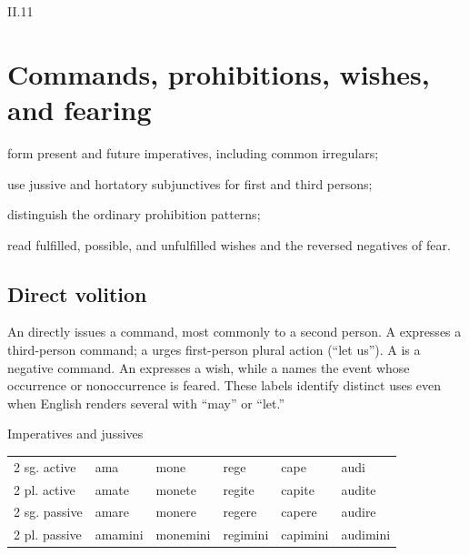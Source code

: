 \begin{courseunit}{II.11}
\chapter{Commands, prohibitions, wishes, and fearing}

\begin{learningobjectives}
  \item form present and future imperatives, including common irregulars;
  \item use jussive and hortatory subjunctives for first and third persons;
  \item distinguish the ordinary prohibition patterns;
  \item read fulfilled, possible, and unfulfilled wishes and the reversed negatives of fear.
\end{learningobjectives}

\section{Direct volition}

An  directly issues a command, most commonly to a second
person. A  expresses a third-person command; a 
urges first-person plural action (``let us''). A  is a
negative command. An  expresses a wish, while a
 names the event whose occurrence or nonoccurrence is feared.
These labels identify distinct uses even when English renders several with
``may'' or ``let.''

\begin{grammarbox}{Imperatives and jussives}
\begin{center}
\begin{tabular}{@{}llllll@{}}
\toprule
& \Latin{amo} & \Latin{moneo} & \Latin{rego} & \Latin{capio} & \Latin{audio}\\ \midrule
2 sg. active & ama & mone & rege & cape & audi\\
2 pl. active & amate & monete & regite & capite & audite\\
2 sg. passive & amare & monere & regere & capere & audire\\
2 pl. passive & amamini & monemini & regimini & capimini & audimini\\
\bottomrule
\end{tabular}
\end{center}


\end{grammarbox}
\end{courseunit}
